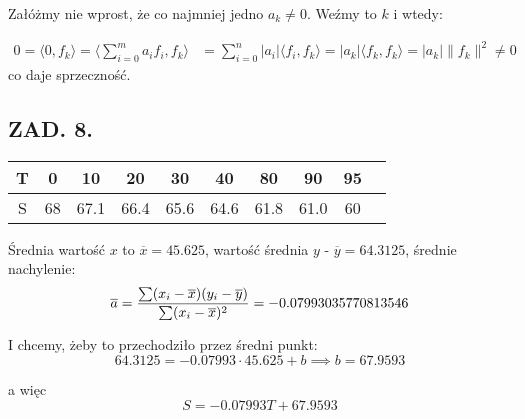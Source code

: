 \documentclass{article}[16pt]
\begin{document}
Załóżmy nie wprost, że co najmniej jedno $a_k\neq 0$. Weźmy to $k$ i wtedy:

\begin{align*}
    0=\langle0,f_k\rangle=\langle \sum\limits_{i=0}^ma_if_i,f_k\rangle&=\sum\limits_{i=0}^n|a_i|\langle f_i,f_k\rangle=|a_k|\langle f_k,f_k\rangle=|a_k|\|f_k\|^2\neq 0
\end{align*}
co daje sprzeczność.

\subsection*{ZAD. 8.}

\begin{center}
\begin{tabular}{c || c | c | c | c | c | c | c | c | c |}
    T & 0 & 10 & 20 & 30 & 40 & 80 & 90 & 95\\

    \hline

    S & 68 & 67.1 & 66.4 & 65.6 & 64.6 & 61.8 & 61.0 & 60
\end{tabular}
\end{center}

Średnia wartość $x$ to $\overline x=45.625$, wartość średnia $y$ - $\overline{y}=64.3125$, średnie nachylenie:
$$\overline{a}={\sum(x_i-\overline{x})(y_i-\overline{y})\over \sum(x_i-\overline{x})^2}=-0.07993035770813546$$

I chcemy, żeby to przechodziło przez średni punkt:
$$64.3125=-0.07993\cdot 45.625+b\implies b = 67.9593$$

a więc
$$S=-0.07993T+67.9593$$

\begin{center}
\end{center}
\end{document}
